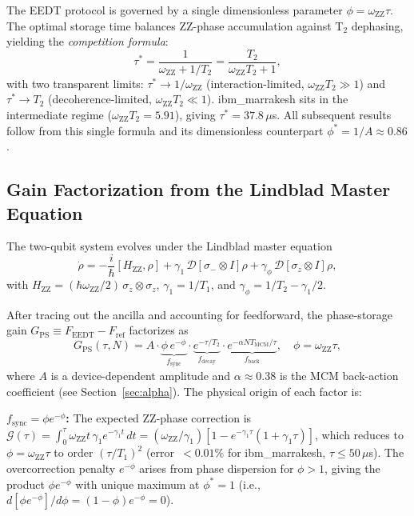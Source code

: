 \documentclass[10pt,twocolumn]{article}
\newcommand{\GPS}{G_{\mathrm{PS}}}
\newcommand{\oZZ}{\omega_{\mathrm{ZZ}}}
\newcommand{\Tmc}{T_{\mathrm{MCM}}}
\newcommand{\taustar}{\tau^*}
\begin{document}
The EEDT protocol is governed by a single dimensionless parameter
$\phi = \oZZ\tau$.
The optimal storage time balances ZZ-phase accumulation against
T$_2$ dephasing, yielding the \emph{competition formula}:
\begin{equation}
  \taustar
  = \frac{1}{\oZZ + 1/T_2}
  = \frac{T_2}{\oZZ T_2 + 1},
  \label{eq:taustar_main}
\end{equation}
with two transparent limits:
$\taustar \to 1/\oZZ$ (interaction-limited, $\oZZ T_2\gg1$) and
$\taustar \to T_2$ (decoherence-limited, $\oZZ T_2\ll1$).
ibm\_marrakesh sits in the intermediate regime
($\oZZ T_2 = 5.91$), giving $\taustar = 37.8\,\mu$s.
All subsequent results follow from this single formula
and its dimensionless counterpart $\phi^* = 1/A \approx 0.86$.

\subsection{Gain Factorization from the Lindblad Master Equation}

The two-qubit system evolves under the Lindblad master equation~\cite{Breuer2002}
\begin{equation}
  \dot{\rho} = -\frac{i}{\hbar}[H_\mathrm{ZZ},\rho]
    + \gamma_1\,\mathcal{D}[\sigma_-\!\otimes\!I]\rho
    + \gamma_\phi\,\mathcal{D}[\sigma_z\!\otimes\!I]\rho,
  \label{eq:lindblad}
\end{equation}
with $H_\mathrm{ZZ} = (\hbar\oZZ/2)\,\sigma_z\otimes\sigma_z$,
$\gamma_1 = 1/T_1$, and $\gamma_\phi = 1/T_2 - \gamma_1/2$.

After tracing out the ancilla and accounting for feedforward, the
phase-storage gain $\GPS \equiv F_\mathrm{EEDT} - F_\mathrm{ref}$
factorizes as
\begin{equation}
  \GPS(\tau,N) = A \cdot
    \underbrace{\phi\,e^{-\phi}}_{f_\mathrm{sync}} \cdot
    \underbrace{e^{-\tau/T_2}}_{f_\mathrm{decay}} \cdot
    \underbrace{e^{-\alpha N \Tmc/\tau}}_{f_\mathrm{back}},
  \quad \phi = \oZZ\tau,
  \label{eq:factorization}
\end{equation}
where $A$ is a device-dependent amplitude and $\alpha\approx0.38$
is the MCM back-action coefficient (see Section~\ref{sec:alpha}).
The physical origin of each factor is:

\textbf{$f_\mathrm{sync} = \phi e^{-\phi}$:}
The expected ZZ-phase correction is
$\mathcal{G}(\tau) = \int_0^\tau \oZZ t\,\gamma_1 e^{-\gamma_1 t}\,dt
= (\oZZ/\gamma_1)[1 - e^{-\gamma_1\tau}(1+\gamma_1\tau)]$,
which reduces to $\phi = \oZZ\tau$ to order $(\tau/T_1)^2$
(error~$<0.01\%$ for ibm\_marrakesh, $\tau \le 50\,\mu$s).
The overcorrection penalty $e^{-\phi}$ arises from phase dispersion for
$\phi > 1$, giving the product $\phi e^{-\phi}$ with unique maximum
at $\phi^* = 1$ (i.e., $d[\phi e^{-\phi}]/d\phi = (1-\phi)e^{-\phi} = 0$).
\end{document}
